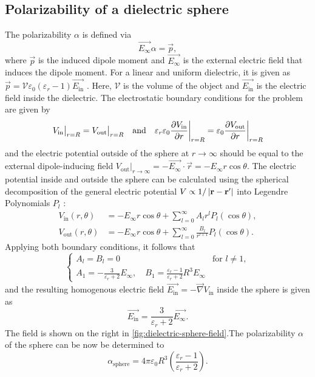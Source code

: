 \subsection{Polarizability of a dielectric sphere}
The polarizability $\alpha$ is defined via
\begin{equation}
  \vec{E_\infty} \alpha = \vec{p},
\end{equation}
where $\vec{p}$ is the induced dipole moment and $\vec{E_\infty}$ is the external electric field that induces the dipole moment. For a linear and uniform dielectric, it is given as $\vec{p} = \mathcal{V} \varepsilon_0 (\varepsilon_r - 1) \vec{E_\mathrm{in}}$ \cite[p. 220-226]{Griffiths_2018}. Here, $\mathcal{V}$ is the volume of the object and $\vec{E_\mathrm{in}}$ is the electric field inside the dielectric.
The electrostatic boundary conditions for the problem are given by
\begin{equation}
  V_\mathrm{in} \big|_{r=R} = V_\mathrm{out} \big|_{r=R} 
  \quad \text{and} \quad 
  \varepsilon_r\varepsilon_0\pdv{V_\mathrm{in}}{r}\bigg|_{r=R} = \varepsilon_0\pdv{V_\mathrm{out}}{r} \bigg|_{r=R}
\end{equation}
and the electric potential outside of the sphere at $r\rightarrow\infty$ should be equal to the external dipole-inducing field $V_\mathrm{out} |_{r\rightarrow\infty} = -\vec{E_\infty} \cdot \vec{r} = -E_\infty r\cos\theta$.
The electric potential inside and outside the sphere can be calculated using the spherical decomposition of the general electric potential $V \propto 1/\abs{\vec{r} - \vec{r'}}$ into Legendre Polynomials $P_l$ \cite[p. 188-190]{Griffiths_2018}:
\begin{align}
  V_\mathrm{in}(r, \theta) &= -E_\infty r\cos\theta + \sum_{l=0}^{\infty} A_l r^l P_l(\cos\theta), \\
  V_\mathrm{out}(r, \theta) &= -E_\infty r \cos\theta + \sum_{l=0}^{\infty} \frac{B_l}{r^{l+1}} P_l(\cos\theta).
\end{align}
Applying both boundary conditions, it follows that \cite[p. 249-251]{Griffiths_2018}
\begin{equation}
  \begin{cases}
    A_l = B_l = 0 & \text{for } l \neq 1, \\
  A_1 = -\frac{3}{\varepsilon_r + 2}E_\infty, \quad B_1 = \frac{\varepsilon_r-1}{\varepsilon_r + 2}R^3E_\infty
  \end{cases}
\end{equation}
and the resulting  homogenous electric field $\vec{E_\mathrm{in}} = -\vec{\nabla} V_\mathrm{in}$ inside the sphere is given as
\begin{equation}
  \vec{E_\mathrm{in}} = \frac{3}{\varepsilon_r + 2} \vec{E_\infty} .
\end{equation}
The field is shown on the right in \cref{fig:dielectric-sphere-field}.The polarizability $\alpha$ of the sphere can be now be determined to
\begin{equation}
  \alpha_\mathrm{sphere} = 4\pi \varepsilon_0 R^3 \left(\frac{\varepsilon_r - 1}{\varepsilon_r + 2}\right).
\end{equation}

